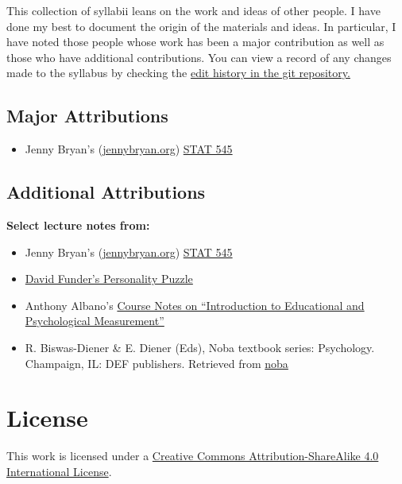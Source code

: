 \documentclass[
]{book}
\providecommand{\tightlist}{%
  \setlength{\itemsep}{0pt}\setlength{\parskip}{0pt}}
\begin{document}
This collection of syllabii leans on the work and ideas of other people. I have done my best to document the origin of the materials and ideas. In particular, I have noted those people whose work has been a major contribution as well as those who have additional contributions. You can view a record of any changes made to the syllabus by checking the \href{https://github.com/smasongarrison/Syllabi/commits/main}{edit history in the git repository.}

\section*{Major Attributions}\label{major-attributions}


\begin{itemize}
\tightlist
\item
  Jenny Bryan's (\href{https://jennybryan.org}{jennybryan.org}) \href{https://stat545.com}{STAT 545}
\end{itemize}

\section*{Additional Attributions}\label{additional-attributions}


\textbf{Select lecture notes from:}

\begin{itemize}
\tightlist
\item
  Jenny Bryan's (\href{https://jennybryan.org/}{jennybryan.org}) \href{https://stat545.com/}{STAT 545}
\item
  \href{https://wwnorton.com/books/The-Personality-Puzzle/}{David Funder's Personality Puzzle}
\item
  Anthony Albano's \href{https://www.thetaminusb.com/intro-measurement-r/}{Course Notes on ``Introduction to Educational and Psychological Measurement''}
\item
  R. Biswas-Diener \& E. Diener (Eds), Noba textbook series: Psychology. Champaign, IL: DEF publishers. Retrieved from \href{https://nobaproject.com/}{noba}
\end{itemize}

\chapter*{License}\label{license}


This work is licensed under a \href{https://creativecommons.org/licenses/by-sa/4.0/}{Creative Commons Attribution-ShareAlike 4.0 International License}.
\end{document}
